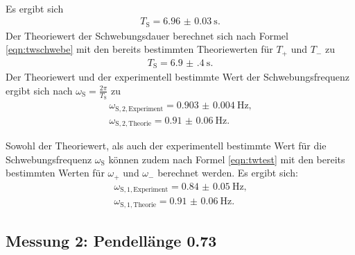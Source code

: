\\Es ergibt sich
\begin{align*}
	T_{\mathrm{S}}=\SI{6.96(3)}{\second}\text{.}
\end{align*}
Der Theoriewert der Schwebungsdauer berechnet sich nach Formel \eqref{eqn:twschwebe} mit den bereits bestimmten Theoriewerten für $T_{\mathrm{+}}$ und $T_{\mathrm{-}}$ zu
\begin{align*}
	T_{\mathrm{S}}=\SI{6.9(4)}{\second}\text{.}
\end{align*}
Der Theoriewert und der experimentell bestimmte Wert der Schwebungsfrequenz ergibt sich nach $\omega_{\mathrm{S}}=\frac{2\pi}{T_{\mathrm{S}}}$ zu
\begin{align*}
	\omega_{\mathrm{S, 2, Experiment}}=\SI{0.903(4)}{\Hz}\text{,} \\
	\omega_{\mathrm{S, 2, Theorie}}=\SI{0.91(6)}{\Hz}\text{.}
\end{align*}

Sowohl der Theoriewert, als auch der experimentell bestimmte Wert für die Schwebungsfrequenz $\omega_{\mathrm{S}}$ können zudem nach Formel \eqref{eqn:twtest} mit den bereits bestimmten Werten für $\omega_{\mathrm{+}}$ und $\omega_{\mathrm{-}}$ berechnet werden.
Es ergibt sich:
\begin{align*}
	\omega_{\mathrm{S, 1, Experiment}}=\SI{0.84(5)}{\Hz}\text{,} \\
	\omega_{\mathrm{S, 1, Theorie}}=\SI{0.91(6)}{\Hz}\text{.}
\end{align*}






\FloatBarrier
\subsection{Messung 2: Pendellänge 0.73}

